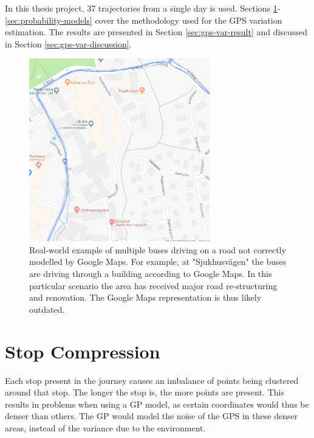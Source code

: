 In this thesis project, 37 trajectories from a single day is used.
Sections \ref{sec:stop-compression}-\ref{sec:probability-models} cover the methodology used for the GPS variation estimation.
The results are presented in Section \ref{sec:gps-var-result} and discussed in Section \ref{sec:gps-var-discussion}.  

\begin{figure}[ht!]
    \centering
    \includegraphics[width=0.7\textwidth]{figures/gps_map_problem}
    \caption[Real-world example of multiple buses driving on a road not correctly modelled by Google Maps]
    {\small Real-world example of multiple buses driving on a road not correctly modelled by Google Maps.
    For example, at "Sjukhusvägen" the buses are driving through a building according to Google Maps.
    In this particular scenario the area has received major road re-structuring and renovation.
    The Google Maps representation is thus likely outdated.}
    \label{fig:gps-map-problem}
\end{figure}

\section{Stop Compression} \label{sec:stop-compression}
Each stop present in the journey causes an imbalance of points being clustered around that stop.
The longer the stop is, the more points are present.
This results in problems when using a GP model, as certain coordinates would thus be denser than others.
The GP would model the noise of the GPS in these denser areas, instead of the variance due to the environment.

